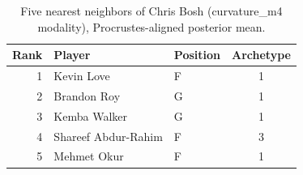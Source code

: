 \begin{table}[htbp]
  \centering\small
  \begin{tabular}{rllc}
    \toprule
    Rank & Player & Position & Archetype \\
    \midrule
    1 & Kevin Love & F & 1 \\
    2 & Brandon Roy & G & 1 \\
    3 & Kemba Walker & G & 1 \\
    4 & Shareef Abdur-Rahim & F & 3 \\
    5 & Mehmet Okur & F & 1 \\
    \bottomrule
  \end{tabular}
  \caption{Five nearest neighbors of Chris Bosh (curvature_m4 modality), Procrustes-aligned posterior mean.}
  \label{tab:Chris_Bosh_neighbors_curvature_m4}
\end{table}

